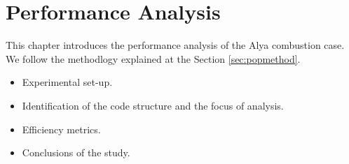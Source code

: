 \chapter{Performance Analysis}

This chapter introduces the performance analysis of the Alya combustion case. We follow the methodlogy explained at the Section \ref{sec:popmethod}.
\begin{itemize}
  \item Experimental set-up.
  \item Identification of the code structure and the focus of analysis.
  \item Efficiency metrics.
  \item Conclusions of the study.
\end{itemize}











